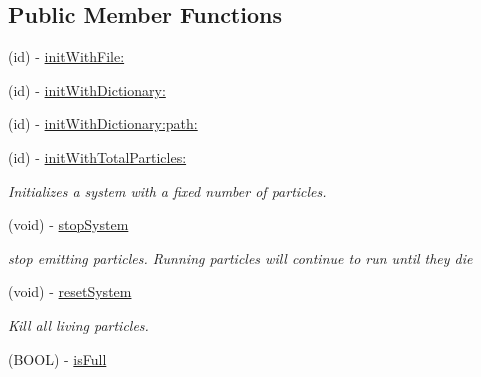 \subsection*{Public Member Functions}
\begin{DoxyCompactItemize}
\item 
(id) -\/ \hyperlink{interface_c_c_particle_system_ad17d6bbf0e24418a924467d001b22077}{init\-With\-File\-:}
\item 
(id) -\/ \hyperlink{interface_c_c_particle_system_a66665353974e9230d34c0afe85dc4f6b}{init\-With\-Dictionary\-:}
\item 
(id) -\/ \hyperlink{interface_c_c_particle_system_a0658d053b3e1750aa23353836f97e0fe}{init\-With\-Dictionary\-:path\-:}
\item 
\hypertarget{interface_c_c_particle_system_a8683219d9b792b7700621304683ed682}{(id) -\/ \hyperlink{interface_c_c_particle_system_a8683219d9b792b7700621304683ed682}{init\-With\-Total\-Particles\-:}}\label{interface_c_c_particle_system_a8683219d9b792b7700621304683ed682}

\begin{DoxyCompactList}\small\item\em Initializes a system with a fixed number of particles. \end{DoxyCompactList}\item 
\hypertarget{interface_c_c_particle_system_aeafd729835e850817731cee0bd210c87}{(void) -\/ \hyperlink{interface_c_c_particle_system_aeafd729835e850817731cee0bd210c87}{stop\-System}}\label{interface_c_c_particle_system_aeafd729835e850817731cee0bd210c87}

\begin{DoxyCompactList}\small\item\em stop emitting particles. Running particles will continue to run until they die \end{DoxyCompactList}\item 
\hypertarget{interface_c_c_particle_system_a31dff0928f67557b12d66ec09d773394}{(void) -\/ \hyperlink{interface_c_c_particle_system_a31dff0928f67557b12d66ec09d773394}{reset\-System}}\label{interface_c_c_particle_system_a31dff0928f67557b12d66ec09d773394}

\begin{DoxyCompactList}\small\item\em Kill all living particles. \end{DoxyCompactList}\item 
\hypertarget{interface_c_c_particle_system_adb1505c126810f39c2d7d3c506dbfd1c}{(B\-O\-O\-L) -\/ \hyperlink{interface_c_c_particle_system_adb1505c126810f39c2d7d3c506dbfd1c}{is\-Full}}\label{interface_c_c_particle_system_adb1505c126810f39c2d7d3c506dbfd1c}


\end{DoxyCompactItemize}
